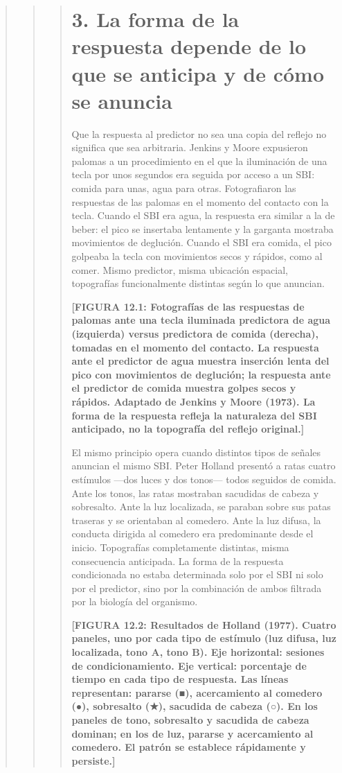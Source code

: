 \documentclass[
  letterpaper,
  DIV=11,
  numbers=noendperiod]{scrreprt}
\begin{document}
\begin{tcolorbox}[enhanced jigsaw, toprule=.15mm, arc=.35mm, colback=white, opacityback=0, colframe=quarto-callout-note-color-frame, breakable, rightrule=.15mm, left=2mm, leftrule=.75mm, bottomrule=.15mm]
\begin{quote}
\begin{quote}
\begin{quote}
\section{3. La forma de la respuesta depende de lo que se anticipa y de
cómo se
anuncia}\label{la-forma-de-la-respuesta-depende-de-lo-que-se-anticipa-y-de-cuxf3mo-se-anuncia}

Que la respuesta al predictor no sea una copia del reflejo no significa
que sea arbitraria. Jenkins y Moore expusieron palomas a un
procedimiento en el que la iluminación de una tecla por unos segundos
era seguida por acceso a un SBI: comida para unas, agua para otras.
Fotografiaron las respuestas de las palomas en el momento del contacto
con la tecla. Cuando el SBI era agua, la respuesta era similar a la de
beber: el pico se insertaba lentamente y la garganta mostraba
movimientos de deglución. Cuando el SBI era comida, el pico golpeaba la
tecla con movimientos secos y rápidos, como al comer. Mismo predictor,
misma ubicación espacial, topografías funcionalmente distintas según lo
que anuncian.

\textbf{{[}FIGURA 12.1: Fotografías de las respuestas de palomas ante
una tecla iluminada predictora de agua (izquierda) versus predictora de
comida (derecha), tomadas en el momento del contacto. La respuesta ante
el predictor de agua muestra inserción lenta del pico con movimientos de
deglución; la respuesta ante el predictor de comida muestra golpes secos
y rápidos. Adaptado de Jenkins y Moore (1973). La forma de la respuesta
refleja la naturaleza del SBI anticipado, no la topografía del reflejo
original.{]}}

El mismo principio opera cuando distintos tipos de señales anuncian el
mismo SBI. Peter Holland presentó a ratas cuatro estímulos ---dos luces
y dos tonos--- todos seguidos de comida. Ante los tonos, las ratas
mostraban sacudidas de cabeza y sobresalto. Ante la luz localizada, se
paraban sobre sus patas traseras y se orientaban al comedero. Ante la
luz difusa, la conducta dirigida al comedero era predominante desde el
inicio. Topografías completamente distintas, misma consecuencia
anticipada. La forma de la respuesta condicionada no estaba determinada
solo por el SBI ni solo por el predictor, sino por la combinación de
ambos filtrada por la biología del organismo.

\textbf{{[}FIGURA 12.2: Resultados de Holland (1977). Cuatro paneles,
uno por cada tipo de estímulo (luz difusa, luz localizada, tono A, tono
B). Eje horizontal: sesiones de condicionamiento. Eje vertical:
porcentaje de tiempo en cada tipo de respuesta. Las líneas representan:
pararse (■), acercamiento al comedero (●), sobresalto (★), sacudida de
cabeza (○). En los paneles de tono, sobresalto y sacudida de cabeza
dominan; en los de luz, pararse y acercamiento al comedero. El patrón se
establece rápidamente y persiste.{]}}


\end{quote}
\end{quote}
\end{quote}
\end{tcolorbox}
\end{document}
